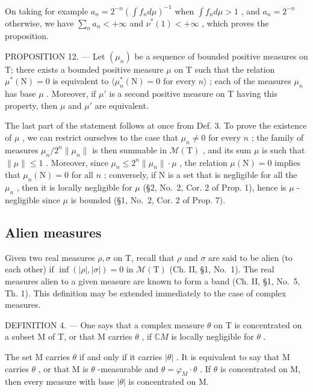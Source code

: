 On taking for example \(a_{n} = 2^{-n}\left(\int f_{n}d\mu\right)^{-1}\) when \(\int f_n d\mu > 1\) , and \(a_{n} = 2^{-n}\) otherwise, we have \(\sum_{n}a_{n} < +\infty\) and \(\nu^{*}(1) < +\infty\) , which proves the proposition.

PROPOSITION 12. --- Let \((\mu_n)\) be a sequence of bounded positive measures on T; there exists a bounded positive measure \(\mu\) on T such that the relation \(\mu^*(\mathrm{N}) = 0\) is equivalent to \(\langle \mu_n^*(\mathrm{N}) = 0 \text{ for every } n \rangle\) ; each of the measures \(\mu_n\) has base \(\mu\) . Moreover, if \(\mu'\) is a second positive measure on T having this property, then \(\mu\) and \(\mu'\) are equivalent.

The last part of the statement follows at once from Def. 3. To prove the existence of \(\mu\) , we can restrict ourselves to the case that \(\mu_n \neq 0\) for every \(n\) ; the family of measures \(\mu_n / 2^n \| \mu_n \|\) is then summable in \(\mathcal{M}(\mathrm{T})\) , and its sum \(\mu\) is such that \(\| \mu \| \leqslant 1\) . Moreover, since \(\mu_n \leqslant 2^n \| \mu_n \| \cdot \mu\) , the relation \(\mu(\mathrm{N}) = 0\) implies that \(\mu_n(\mathrm{N}) = 0\) for all \(n\) ; conversely, if \(\mathrm{N}\) is a set that is negligible for all the \(\mu_n\) , then it is locally negligible for \(\mu\) (§2, No.~2, Cor. 2 of Prop. 1), hence is \(\mu\) -negligible since \(\mu\) is bounded (§1, No.~2, Cor. 2 of Prop. 7).

\subsection{Alien measures}

Given two real measures \(\rho,\sigma\) on T, recall that \(\rho\) and \(\sigma\) are said to be alien (to each other) if \(\inf(|\rho|,|\sigma|)=0\) in \(\mathcal{M}(\mathrm{T})\) (Ch. II, §1, No.~1). The real measures alien to a given measure are known to form a band (Ch. II, §1, No.~5, Th. 1). This definition may be extended immediately to the case of complex measures.

DEFINITION 4. --- One says that a complex measure \(\theta\) on T is concentrated on a subset M of T, or that M carries \(\theta\) , if \(\mathbb{C}M\) is locally negligible for \(\theta\) .

The set M carries \(\theta\) if and only if it carries \(|\theta|\) . It is equivalent to say that M carries \(\theta\) , or that M is \(\theta\) -measurable and \(\theta = \varphi_{M} \cdot \theta\) . If \(\theta\) is concentrated on M, then every measure with base \(|\theta|\) is concentrated on M.

